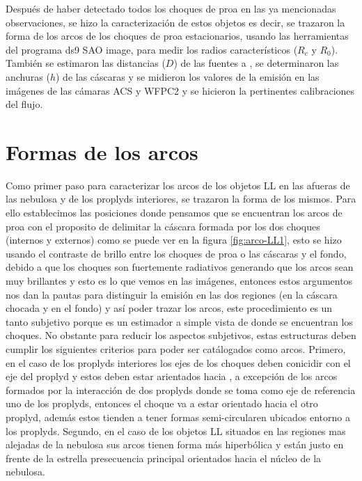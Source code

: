 Después de haber detectado todos los choques de proa en las ya mencionadas observaciones, se hizo la caracterización de estos objetos es decir, se trazaron la forma de los arcos de los choques de proa estacionarios, usando las herramientas del programa ds9 SAO image,  para medir los radios característicos (\(R_{c}\) y \( R_{0}\)). También se estimaron las distancias (\(D\)) de las fuentes a \thC{}, se determinaron las anchuras (\(h\)) de las cáscaras y se  midieron  los valores de la emisión en las imágenes de las cámaras ACS y WFPC2 y se hicieron la pertinentes calibraciones del flujo.

\section{Formas de los arcos}
\label{sec:arcos}

Como primer paso para caracterizar los arcos de los objetos LL en las afueras de las nebulosa y de los proplyds interiores, se trazaron la forma de los mismos. Para ello establecimos las posiciones donde pensamos que se encuentran los arcos de proa con el proposito de delimitar la cáscara formada por los dos choques (internos y externos) como se puede ver en la figura \ref{fig:arco-LL1}, esto se hizo usando el contraste de brillo entre los choques de proa o las cáscaras y el fondo, debido a que los choques son fuertemente radiativos generando que los arcos sean muy brillantes y esto es lo que vemos en las imágenes, entonces estos argumentos nos dan la pautas para distinguir la emisión en las dos regiones (en la cáscara chocada y en el fondo) y así poder trazar los arcos, este procedimiento es un tanto subjetivo porque es un estimador a simple vista de donde se encuentran los choques. No obstante para reducir los aspectos subjetivos, estas estructuras deben cumplir los siguientes criterios para poder ser catálogados como arcos. Primero, en el caso de los proplyds interiores los ejes de los choques deben conicidir con el eje del proplyd y estos deben estar arientados hacia \thC, a excepción de los arcos formados por la interacción de dos proplyds donde se toma como eje de referencia uno de los proplyds, entonces el choque va a estar orientado hacia el otro proplyd, además estos tienden a tener formas  semi-circularen  ubicados entorno a los proplyds. Segundo, en el caso de los objetos LL situados en las regiones mas alejadas de la nebulosa sus arcos tienen forma más hiperbólica y están justo en frente de la estrella presecuencia principal orientados hacia el núcleo de la nebulosa. \\

